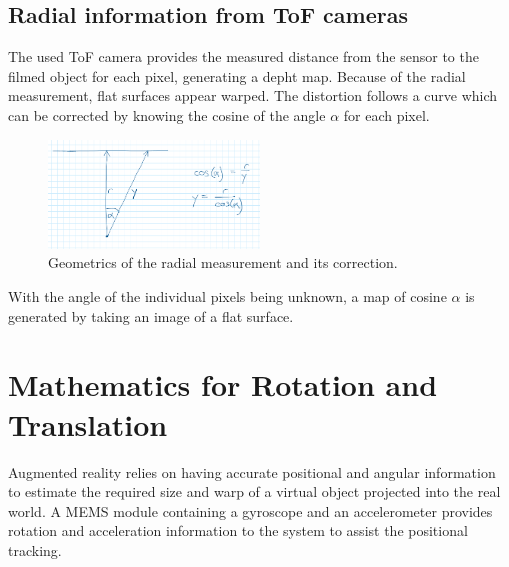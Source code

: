 \subsection{Radial information from ToF cameras}
The used ToF camera provides the measured distance from the sensor to the filmed object for each pixel, generating a depht map. Because of the radial measurement, flat surfaces appear warped. The distortion follows a curve which can be corrected by knowing the cosine of the angle $\alpha$ for each pixel.
\begin{figure}[H]
    \centering
    \includegraphics[width=0.5\textwidth]{images/dummy_radial_angle.png}
    \caption{Geometrics of the radial measurement and its correction.}
    \label{im:RadialCorrection}
\end{figure}
With the angle of the individual pixels being unknown, a map of cosine $\alpha$ is generated by taking an image of a flat surface.
\section{Mathematics for Rotation and Translation}
\label{sec:LinAlgRotation}
Augmented reality relies on having accurate positional and angular information to estimate the required size and warp of a virtual object projected into the real world. A MEMS module containing a gyroscope and an accelerometer provides rotation and acceleration information to the system to assist the positional tracking.
